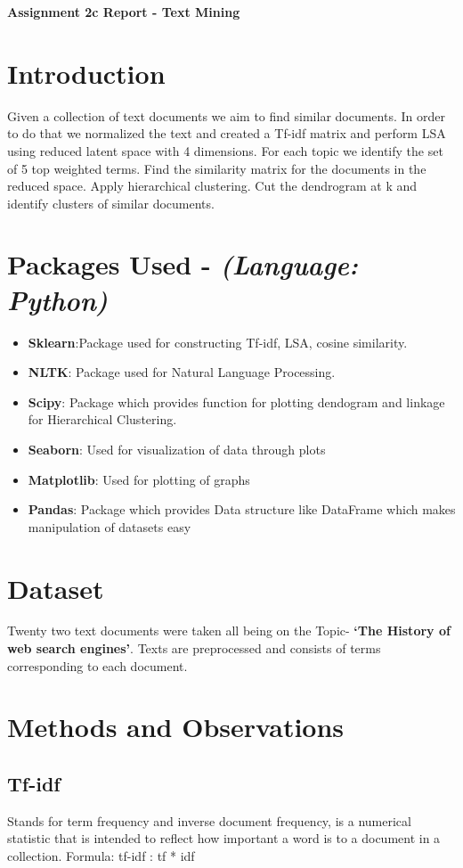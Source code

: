 \documentclass[7pt,a4paper]{article}
\begin{document}
\textbf{\LARGE Assignment 2c Report - Text Mining}
\section{Introduction}
Given a collection of text documents we aim to find similar documents. In order to do that we normalized the text and created a Tf-idf matrix and perform LSA using reduced latent space with 4 dimensions. For each topic we identify the set of 5 top weighted terms. Find the similarity matrix for the documents in the reduced space. Apply hierarchical clustering. Cut the dendrogram at k and identify clusters of similar documents.

\section{Packages Used - \textit{(Language: Python)}}
\begin{itemize}
\item{\textbf{Sklearn}:Package used for constructing Tf-idf, LSA, cosine similarity.}
\item{\textbf{NLTK}: Package used for Natural Language Processing.}
\item{\textbf{Scipy}: Package which provides function for plotting dendogram and linkage for Hierarchical Clustering.}
\item{\textbf{Seaborn}: Used for visualization of data through plots}
\item{\textbf{Matplotlib}: Used for plotting of graphs}
\item{\textbf{Pandas}: Package which provides Data structure like DataFrame which makes
manipulation of datasets easy}
\end{itemize}

\section{Dataset}
Twenty two text documents were taken all being on the Topic- \textbf{‘The History of web search engines’}. Texts are preprocessed and consists of terms corresponding to each document. 

\section{Methods and Observations}
\subsection{Tf-idf}
Stands for term frequency and inverse document frequency, is a numerical statistic that is intended to reflect how important a word is to a document in a collection.
Formula: tf-idf : tf * idf 
 				 
\end{document}
